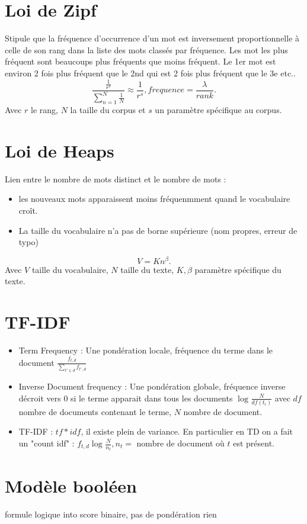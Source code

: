 \documentclass{article}
\begin{document}
\begin{multicols}{2}
\section{Loi de Zipf}
Stipule que la fréquence d'occurrence d'un mot est inversement proportionnelle à celle de son rang dans la liste des mots classés par fréquence. Les mot les plus fréquent sont beaucoups plus fréquents que moins fréquent. Le 1er mot est environ 2 fois plus fréquent que le 2nd qui est 2 fois plus fréquent que le 3e etc.. 
\[
    \frac{ \frac{1 }{r^s}}{ \sum_{n=1}^{N} \frac{1}{N}} \approx \frac{1}{r^s}, frequence = \frac{\lambda }{rank}
.\]
Avec $ r $ le rang, $ N $ la taille du corpus et $ s $ un paramètre spécifique au corpus.

\section{Loi de Heaps}
Lien entre le nombre de mots distinct et le nombre de mots : \begin{itemize}
    \item les nouveaux mots apparaissent moins fréquenmment quand le vocabulaire croît. 
    \item La taille du vocabulaire n'a pas de borne supérieure (nom propres, erreur de typo)
\end{itemize} 
\[
    V = K n ^\beta 
.\]
Avec $ V $ taille du vocabulaire, $ N $ taille du texte, $ K, \beta  $ paramètre spécifique du texte.

\section{TF-IDF}
\begin{itemize}
    \item Term Frequency : Une pondération locale, fréquence du terme dans le document $ \frac{f_{t,d}}{\sum_{t' \in d}^{} f_{t', d}} $ 
    \item Inverse Document frequency : Une pondération globale, fréquence inverse décroit vers 0 si le terme apparait dans tous les documents $ \log_{} \frac{N}{df(t_i)} $ avec $ df $ nombre de documents contenant le terme, $ N $ nombre de document. 
    \item TF-IDF : $ tf * idf $, il existe plein de variance. En particulier en TD on a fait un "count idf" : $ f_{t,d} \log_{} \frac{N}{n_t}, n_t = $ nombre de document où $ t $ est présent.
\end{itemize}


\section{Modèle booléen}
formule logique into score binaire, pas de pondération rien

\end{multicols}
\end{document}
